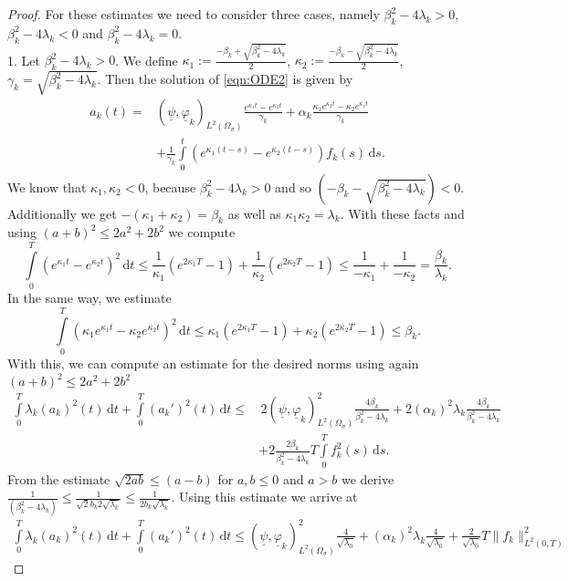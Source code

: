 \documentclass[a4paper,11pt]{article}
\newcommand{\intT}{\int\limits_{0}^T}
\newcommand{\omsig}{\Omega_{\sigma}}
\renewcommand{\vec}[1]{\underline{#1}}
\begin{document}
\begin{proof}
	For these estimates we need to consider three cases, namely $\beta_k^2-4\lambda_k>0$, $\beta_k^2-4\lambda_k<0$ and $\beta_k^2-4\lambda_k=0$.\\
	1. Let $\beta_k^2-4\lambda_k>0$. We define $\kappa_1 :=\frac{-\beta_k + \sqrt{\beta_k^2-4\lambda_k}}{2}$,
	$ \kappa_2 :=\frac{-\beta_k - \sqrt{\beta_k^2-4\lambda_k}}{2}$, $\gamma_k = \sqrt{\beta_k^2-4\lambda_k}$.  Then the solution of \eqref{eqn:ODE2} is given by
	\begin{align*}
		 {a_k} (t) = &(\vec \psi,\vec \varphi_k)_{L^2(\omsig)}\frac{ e^{\kappa_1t}- e^{\kappa_2t}}{\gamma_k}+\alpha_k\frac{ \kappa_1e^{\kappa_2t}- \kappa_2e^{\kappa_1t}}{\gamma_k}\\
		&+\frac{1}{\gamma_k}\int\limits_0^t	( e^{\kappa_1(t-s)}-e^{\kappa_2(t-s)})f_k(s)\,\mathrm ds.
	\end{align*}
	We know that $\kappa_1,\kappa_2<0$, because $\beta_k^2-4\lambda_k>0$ and so $(-\beta_k-\sqrt{\beta_k^2-4\lambda_k})<0$. Additionally we get $-(\kappa_1+\kappa_2) = \beta_k$ as well as $\kappa_1\kappa_2 = \lambda_k$. With these facts and using $(a+b)^2\leq 2 a^2+2b^2$ we compute  
	\[
	\intT  \left(e^{\kappa_1t}- e^{\kappa_2t}\right)^2\,\mathrm dt\leq \frac{1}{\kappa_1}(e^{2\kappa_1 T}-1)+ \frac{1}{\kappa_2}(e^{2\kappa_2 T}-1)\leq \frac{1}{-\kappa_1}+\frac{1}{-\kappa_2} = \frac{\beta_k}{\lambda_k}.
	\]
	In the same way, we estimate
	\[
	\intT  \left(\kappa_1 e^{\kappa_1t}- \kappa_2e^{\kappa_2t}\right)^2\,\mathrm dt\leq \kappa_1(e^{2\kappa_1 T}-1)+\kappa_2(e^{2\kappa_2 T}-1)\leq \beta_k.
	\]
	With this, we can compute an estimate for the desired norms  using again $(a+b)^2\leq 2 a^2+2b^2$
	\begin{align*}
		\intT \lambda_k( {a_k})^2(t)\,\mathrm dt+\intT (  {a_k}')^2(t)\,\mathrm dt\leq&\, 2(\vec \psi,\vec \varphi_k)^2_{L^2(\omsig)}\frac{4 \beta_k}{\beta_k^2-4\lambda_k}+2(\alpha_k)^2\lambda_k\frac{4\beta_k}{\beta_k^2-4\lambda_k}\\
		&+2\frac{2\beta_k}{\beta_k^2-4\lambda_k}T\intT f_k^2(s)\,\mathrm ds.
	\end{align*}
	From the estimate $\sqrt{2ab}\leq (a-b)$ for $a,b\leq 0$ and $a>b$ we derive $ \frac{1}{(\beta_k^2-4\lambda_k)}\leq \frac{1}{\sqrt{2}b_k2\sqrt{\lambda_k}}\leq\frac{1}{2b_k\sqrt{\lambda_k}}$. Using this estimate we arrive at 
	\begin{align*}
		\intT \lambda_k( {a_k})^2(t)\,\mathrm dt+\intT (  {a_k}')^2(t)\,\mathrm dt\leq (\vec \psi,\vec \varphi_k)^2_{L^2(\omsig)}\frac{4 }{\sqrt{\lambda_0}}+(\alpha_k)^2\lambda_k\frac{4 }{\sqrt{\lambda_0}}+\frac{2 }{\sqrt{\lambda_0}}T\| f_k\|^2_{L^2(0,T)}

\end{align*}
\end{proof}
\end{document}
